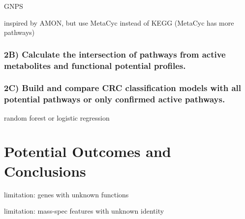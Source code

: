\documentclass[11pt]{article}
\begin{document}
GNPS

inspired by AMON, but use MetaCyc instead of KEGG (MetaCyc has more pathways)

\subsubsection*{2B) Calculate the intersection of pathways from active metabolites and functional potential profiles.}

\subsubsection*{2C) Build and compare CRC classification models with all potential pathways or only confirmed active pathways.}

random forest or logistic regression

\section*{Potential Outcomes and Conclusions}

limitation: genes with unknown functions

limitation: mass-spec features with unknown identity

\pagebreak
\footnotesize{

\par}
\end{document}
